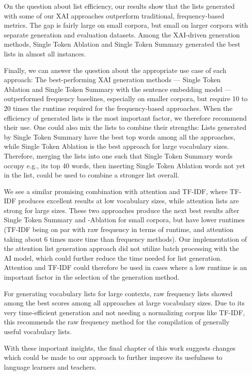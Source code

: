 On the question about list efficiency, our results show that the lists generated with some of our XAI approaches outperform traditional, frequency-based metrics.
The gap is fairly large on small corpora, but small on larger corpora with separate generation and evaluation datasets.
Among the XAI-driven generation methods, Single Token Ablation and Single Token Summary generated the best lists in almost all instances.


Finally, we can answer the question about the appropriate use case of each approach:
The best-performing XAI generation methods --- Single Token Ablation and Single Token Summary with the sentence embedding model --- outperformed frequency baselines, especially on smaller corpora, but require 10 to 20 times the runtime required for the frequency-based approaches.
When the efficiency of generated lists is the most important factor, we therefore recommend their use.
One could also mix the lists to combine their strengths:
Lists generated by Single Token Summary have the best top words among all the approaches, while Single Token Ablation is the best approach for large vocabulary sizes.
Therefore, merging the lists into one such that Single Token Summary words occupy e.g., its top 40 words, then inserting Single Token Ablation words not yet in the list, could be used to combine a stronger list overall.

We see a similar promising combination with attention and TF-IDF, where TF-IDF produces excellent results at low vocabulary sizes, while attention lists are strong for large sizes.
These two approaches produce the next best results after Single Token Summary and -Ablation for small corpora, but have lower runtimes (TF-IDF being on par with raw frequency in terms of runtime, and attention taking about 6 times more time than frequency methods).
Our implementation of the attention list generation approach did not utilize batch processing with the AI model, which could further reduce the time needed for list generation.
Attention and TF-IDF could therefore be used in cases where a low runtime is an important factor in the selection of the generation method.

For generating vocabulary lists for large contexts, raw frequency lists showed among the best scores among all approaches at large vocabulary sizes.
Due to its very time-efficient generation and not needing a normalizing corpus like TF-IDF, this recommends the raw frequency method for the compilation of generally useful vocabulary lists.

With these important insights, the final chapter of this work suggests changes which could be made to our approach to further improve its usefulness to language learners and teachers.



